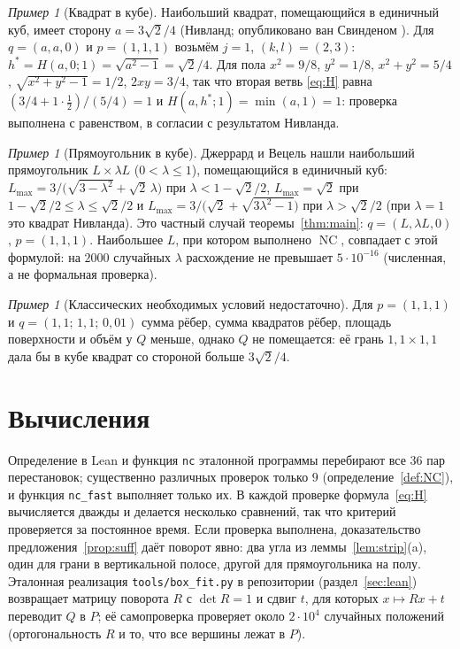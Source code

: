 \documentclass[11pt]{article}
\theoremstyle{definition}
\theoremstyle{remark}
\newtheorem{example}[theorem]{Пример}
\newcommand{\NC}{\operatorname{NC}}
\begin{document}
\begin{example}[Квадрат в кубе]
Наибольший квадрат, помещающийся в единичный куб, имеет сторону $a=3\sqrt2/4$ (Нивланд; опубликовано
ван Свинденом \cite{vanSwinden1816}). Для $q=(a,a,0)$ и $p=(1,1,1)$ возьмём $j=1$, $(k,l)=(2,3)$:
$h^*=H(a,0;1)=\sqrt{a^2-1}=\sqrt2/4$. Для пола $x^2=9/8$, $y^2=1/8$, $x^2+y^2=5/4$,
$\sqrt{x^2+y^2-1}=1/2$, $2xy=3/4$, так что вторая ветвь \eqref{eq:H} равна
$(3/4+1\cdot\tfrac12)/(5/4)=1$ и $H(a,h^*;1)=\min(a,1)=1$: проверка выполнена с равенством, в
согласии с результатом Нивланда.
\end{example}

\begin{example}[Прямоугольник в кубе]
Джеррард и Вецель \cite[теорема~5]{JerrardWetzel2004} нашли наибольший прямоугольник $L\times\lambda L$
($0<\lambda\le1$), помещающийся в единичный куб: $L_{\max}=3/\bigl(\sqrt{3-\lambda^2}+\sqrt2\,\lambda\bigr)$
при $\lambda<1-\sqrt2/2$, $L_{\max}=\sqrt2$ при $1-\sqrt2/2\le\lambda\le\sqrt2/2$ и
$L_{\max}=3/\bigl(\sqrt2+\sqrt{3\lambda^2-1}\bigr)$ при $\lambda>\sqrt2/2$ (при $\lambda=1$ это квадрат
Нивланда). Это частный случай теоремы~\ref{thm:main}: $q=(L,\lambda L,0)$, $p=(1,1,1)$. Наибольшее $L$,
при котором выполнено $\NC$, совпадает с этой формулой: на $2000$ случайных $\lambda$ расхождение не
превышает $5\cdot10^{-16}$ (численная, а не формальная проверка).
\end{example}

\begin{example}[Классических необходимых условий недостаточно]
Для $p=(1,1,1)$ и $q=(1{,}1;\,1{,}1;\,0{,}01)$ сумма рёбер, сумма квадратов рёбер, площадь
поверхности и объём у $Q$ меньше, однако $Q$ не помещается: её грань $1{,}1\times1{,}1$ дала бы в
кубе квадрат со стороной больше $3\sqrt2/4$.
\end{example}

\section{Вычисления}\label{sec:computation}

Определение в Lean и функция \texttt{nc} эталонной программы перебирают все $36$ пар
перестановок; существенно различных проверок только $9$ (определение~\ref{def:NC}), и функция
\texttt{nc\_fast} выполняет только их. В каждой проверке формула~\eqref{eq:H} вычисляется дважды и
делается несколько сравнений, так что критерий проверяется за постоянное время. Если проверка выполнена, доказательство
предложения~\ref{prop:suff} даёт поворот явно: два угла из леммы~\ref{lem:strip}(a), один для грани в
вертикальной полосе, другой для прямоугольника на полу. Эталонная реализация
\texttt{tools/box\_fit.py} в репозитории (раздел~\ref{sec:lean}) возвращает матрицу поворота $R$ с
$\det R=1$ и сдвиг $t$, для которых $x\mapsto Rx+t$ переводит $Q$ в $P$; её самопроверка проверяет
около $2\cdot10^4$ случайных положений (ортогональность $R$ и то, что все вершины лежат в $P$).
\end{document}
